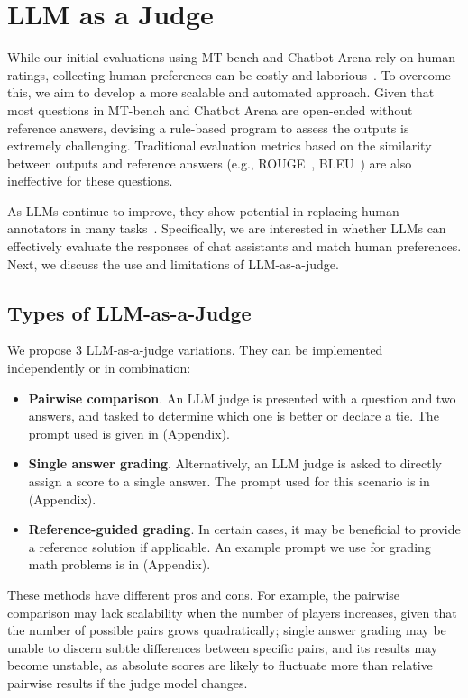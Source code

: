 \section{LLM as a Judge}
\label{sec:llm-as-a-judge}
While our initial evaluations using MT-bench and Chatbot Arena rely on human ratings, collecting human preferences can be costly and laborious~\cite{selfinstruct,alpaca,ouyang2022training,bai2022training,diao2023lmflow}. To overcome this, we aim to develop a more scalable and automated approach. Given that most questions in MT-bench and Chatbot Arena are open-ended without reference answers, devising a rule-based program to assess the outputs is extremely challenging.
Traditional evaluation metrics based on the similarity between outputs and reference answers (e.g., ROUGE~\cite{lin2004rouge}, BLEU~\cite{papineni2002bleu}) are also ineffective for these questions.

As LLMs continue to improve, they show potential in replacing human annotators in many tasks~\cite{gilardi2023chatgpt,huang2023chatgpt}. Specifically, we are interested in whether LLMs can effectively evaluate the responses of chat assistants and match human preferences. Next, we discuss the use and limitations of LLM-as-a-judge.

\subsection{Types of LLM-as-a-Judge}
We propose 3 LLM-as-a-judge variations. They can be implemented independently or in combination:
\begin{itemize}
\item \textbf{Pairwise comparison}. An LLM judge is presented with a question and two answers, and tasked to determine which one is better or declare a tie. The prompt used is given in  (Appendix).
\item \textbf{Single answer grading}.
Alternatively, an LLM judge is asked to directly assign a score to a single answer. The prompt used for this scenario is in  (Appendix).
\item \textbf{Reference-guided grading}.
In certain cases, it may be beneficial to provide a reference solution if applicable. An example prompt we use for grading math problems is in  (Appendix).
\end{itemize}

These methods have different pros and cons. For example, the pairwise comparison may lack scalability when the number of players increases, given that the number of possible pairs grows quadratically; single answer grading may be unable to discern subtle differences between specific pairs, and its results may become unstable, as absolute scores are likely to fluctuate more than relative pairwise results if the judge model changes.


